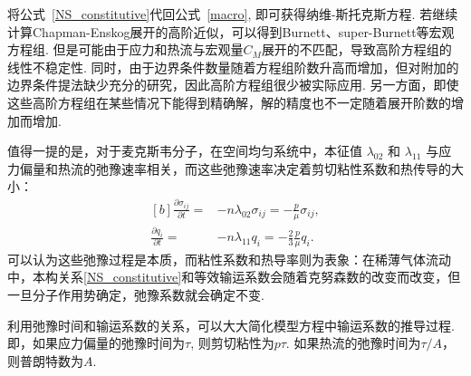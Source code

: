 将公式~\eqref{NS_constitutive}代回公式~\eqref{macro}, 即可获得纳维-斯托克斯方程. 若继续计算Chapman-Enskog展开的高阶近似，可以得到Burnett、super-Burnett等宏观方程组\cite{CE}. 但是可能由于应力和热流与宏观量$C_M$展开的不匹配，导致高阶方程组的线性不稳定性. 同时，由于边界条件数量随着方程组阶数升高而增加，但对附加的边界条件提法缺少充分的研究，因此高阶方程组很少被实际应用. 另一方面，即使这些高阶方程组在某些情况下能得到精确解，解的精度也不一定随着展开阶数的增加而增加\cite{Gu2020AIA}. 

值得一提的是，对于麦克斯韦分子，在空间均匀系统中，本征值 $\lambda_{02}$ 和 $\lambda_{11}$ 与应力偏量和热流的弛豫速率相关，而这些弛豫速率决定着剪切粘性系数和热传导的大小：
\begin{equation}\label{universal_relation}
\begin{aligned}[b]
\frac{\partial \sigma_{ij}}{\partial t}
=&-n\lambda_{02} \sigma_{ij}=-\frac{p}{\mu}\sigma_{ij},\\
\frac{\partial q_{i}}{\partial t}=&-n\lambda_{11} q_{i}=-\frac{2}{3}\frac{p}{\mu}q_{i}.
\end{aligned}
\end{equation}
可以认为这些弛豫过程是本质，而粘性系数和热导率则为表象：在稀薄气体流动中，本构关系\eqref{NS_constitutive}和等效输运系数会随着克努森数的改变而改变，但一旦分子作用势确定，弛豫系数就会确定不变. 

利用弛豫时间和输运系数的关系，可以大大简化模型方程中输运系数的推导过程.  即，如果应力偏量的弛豫时间为$\tau$, 则剪切粘性为$p\tau$. 如果热流的弛豫时间为$\tau/A$，则普朗特数为$A$. 


